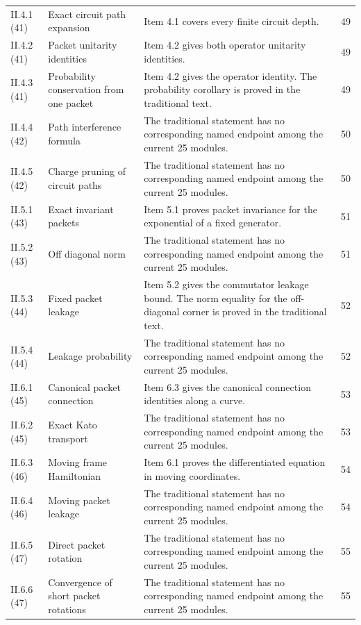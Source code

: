 {\begin{longtable}{@{}p{.13\linewidth}p{.31\linewidth}p{.42\linewidth}r@{}}
II.4.1 (41) & Exact circuit path expansion & Item 4.1 covers every finite circuit depth. & 49\\
II.4.2 (41) & Packet unitarity identities & Item 4.2 gives both operator unitarity identities. & 49\\
II.4.3 (41) & Probability conservation from one packet & Item 4.2 gives the operator identity. The probability corollary is proved in the traditional text. & 49\\
II.4.4 (42) & Path interference formula & The traditional statement has no corresponding named endpoint among the current 25 modules. & 50\\
II.4.5 (42) & Charge pruning of circuit paths & The traditional statement has no corresponding named endpoint among the current 25 modules. & 50\\
II.5.1 (43) & Exact invariant packets & Item 5.1 proves packet invariance for the exponential of a fixed generator. & 51\\
II.5.2 (43) & Off diagonal norm & The traditional statement has no corresponding named endpoint among the current 25 modules. & 51\\
II.5.3 (44) & Fixed packet leakage & Item 5.2 gives the commutator leakage bound. The norm equality for the off-diagonal corner is proved in the traditional text. & 52\\
II.5.4 (44) & Leakage probability & The traditional statement has no corresponding named endpoint among the current 25 modules. & 52\\
II.6.1 (45) & Canonical packet connection & Item 6.3 gives the canonical connection identities along a curve. & 53\\
II.6.2 (45) & Exact Kato transport & The traditional statement has no corresponding named endpoint among the current 25 modules. & 53\\
II.6.3 (46) & Moving frame Hamiltonian & Item 6.1 proves the differentiated equation in moving coordinates. & 54\\
II.6.4 (46) & Moving packet leakage & The traditional statement has no corresponding named endpoint among the current 25 modules. & 54\\
II.6.5 (47) & Direct packet rotation & The traditional statement has no corresponding named endpoint among the current 25 modules. & 55\\
II.6.6 (47) & Convergence of short packet rotations & The traditional statement has no corresponding named endpoint among the current 25 modules. & 55\\

\end{longtable}}
